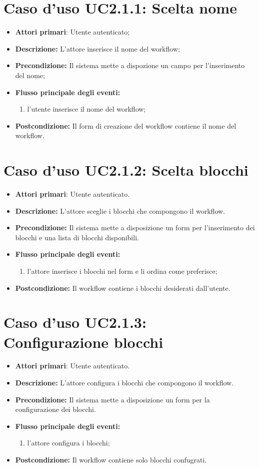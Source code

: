 		\section{Caso d'uso UC2.1.1: Scelta nome }
		\begin{itemize}
			\item \textbf{Attori primari}: Utente autenticato;
			\item \textbf{Descrizione:} L'attore inserisce il nome del workflow;
			\item \textbf{Precondizione:} Il sistema mette a dispozione un campo per l'inserimento del nome;
			\item \textbf{Flusso principale degli eventi:}
			\begin{enumerate}
				\item l'utente inserisce il nome del workflow;
			\end{enumerate}
			\item \textbf{Postcondizione:} Il form di creazione del workflow contiene il nome del workflow.
		\end{itemize}
		\section{Caso d'uso UC2.1.2: Scelta blocchi }
		\begin{itemize}
			\item \textbf{Attori primari}: Utente autenticato.
			\item \textbf{Descrizione:} L'attore sceglie i blocchi che compongono il workflow.
			\item \textbf{Precondizione:} Il sistema mette a disposizione un form per l'inserimento dei blocchi e una lista di blocchi disponibili.
			\item \textbf{Flusso principale degli eventi:}
			\begin{enumerate}
				\item l'attore inserisce i blocchi nel form e li ordina come preferisce;
			\end{enumerate}
			\item \textbf{Postcondizione:} Il workflow contiene i blocchi desiderati dall'utente.
		\end{itemize}
		\section{Caso d'uso UC2.1.3: Configurazione blocchi }
		\begin{itemize}
			\item \textbf{Attori primari}: Utente autenticato.
			\item \textbf{Descrizione:} L'attore configura i blocchi che compongono il workflow.
			\item \textbf{Precondizione:} Il sistema mette a disposizione un form per la configurazione dei blocchi.
			\item \textbf{Flusso principale degli eventi:}
			\begin{enumerate}
				\item l'attore configura i blocchi;
			\end{enumerate}
			\item \textbf{Postcondizione:} Il workflow contiene solo blocchi confugrati.
		\end{itemize}
